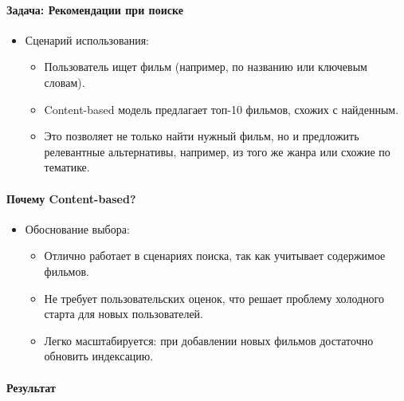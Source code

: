 \hypertarget{ux437ux430ux434ux430ux447ux430-ux440ux435ux43aux43eux43cux435ux43dux434ux430ux446ux438ux438-ux43fux440ux438-ux43fux43eux438ux441ux43aux435}{%
\paragraph{Задача: Рекомендации при
поиске}\label{ux437ux430ux434ux430ux447ux430-ux440ux435ux43aux43eux43cux435ux43dux434ux430ux446ux438ux438-ux43fux440ux438-ux43fux43eux438ux441ux43aux435}}

\begin{itemize}
\tightlist
\item
  Сценарий использования:

  \begin{itemize}
  \tightlist
  \item
    Пользователь ищет фильм (например, по названию или ключевым словам).
  \item
    Content-based модель предлагает топ-10 фильмов, схожих с найденным.
  \item
    Это позволяет не только найти нужный фильм, но и предложить
    релевантные альтернативы, например, из того же жанра или схожие по
    тематике.
  \end{itemize}
\end{itemize}

\hypertarget{ux43fux43eux447ux435ux43cux443-content-based}{%
\paragraph{Почему
Content-based?}\label{ux43fux43eux447ux435ux43cux443-content-based}}

\begin{itemize}
\tightlist
\item
  Обоснование выбора:

  \begin{itemize}
  \tightlist
  \item
    Отлично работает в сценариях поиска, так как учитывает содержимое
    фильмов.
  \item
    Не требует пользовательских оценок, что решает проблему холодного
    старта для новых пользователей.
  \item
    Легко масштабируется: при добавлении новых фильмов достаточно
    обновить индексацию.
  \end{itemize}
\end{itemize}

\hypertarget{ux440ux435ux437ux443ux43bux44cux442ux430ux442-1}{%
\paragraph{Результат}\label{ux440ux435ux437ux443ux43bux44cux442ux430ux442-1}}

